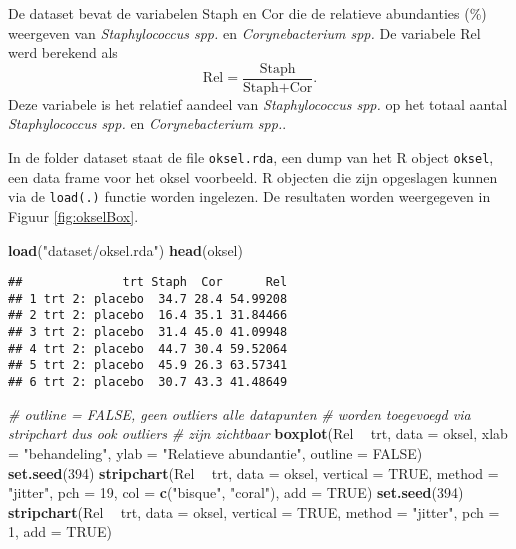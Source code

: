 \documentclass[12pt,dutch,coursenotes]{book}
\newenvironment{Shaded}{\begin{snugshade}}{\end{snugshade}}
\newcommand{\KeywordTok}[1]{\textcolor[rgb]{0.13,0.29,0.53}{\textbf{#1}}}
\newcommand{\DataTypeTok}[1]{\textcolor[rgb]{0.13,0.29,0.53}{#1}}
\newcommand{\DecValTok}[1]{\textcolor[rgb]{0.00,0.00,0.81}{#1}}
\newcommand{\StringTok}[1]{\textcolor[rgb]{0.31,0.60,0.02}{#1}}
\newcommand{\CommentTok}[1]{\textcolor[rgb]{0.56,0.35,0.01}{\textit{#1}}}
\newcommand{\OtherTok}[1]{\textcolor[rgb]{0.56,0.35,0.01}{#1}}
\newcommand{\OperatorTok}[1]{\textcolor[rgb]{0.81,0.36,0.00}{\textbf{#1}}}
\newcommand{\NormalTok}[1]{#1}
\theoremstyle{definition}
\theoremstyle{definition}
\theoremstyle{definition}
\theoremstyle{remark}
\begin{document}
De dataset bevat de variabelen Staph en Cor die de relatieve abundanties
(\%) weergeven van \emph{Staphylococcus spp.} en \emph{Corynebacterium
spp.} De variabele Rel werd berekend als \[
    \text{Rel}=\frac{\text{Staph}}{\text{Staph}+\text{Cor}}.
  \] Deze variabele is het relatief aandeel van \emph{Staphylococcus
spp.} op het totaal aantal \emph{Staphylococcus spp.} en
\emph{Corynebacterium spp.}.

In de folder dataset staat de file \texttt{oksel.rda}, een dump van het
R object \texttt{oksel}, een data frame voor het oksel voorbeeld. R
objecten die zijn opgeslagen kunnen via de \texttt{load(.)} functie
worden ingelezen. De resultaten worden weergegeven in Figuur
\ref{fig:okselBox}.

\begin{Shaded}
\begin{Highlighting}[]
\KeywordTok{load}\NormalTok{(}\StringTok{"dataset/oksel.rda"}\NormalTok{)}
\KeywordTok{head}\NormalTok{(oksel)}
\end{Highlighting}
\end{Shaded}

\begin{verbatim}
##              trt Staph  Cor      Rel
## 1 trt 2: placebo  34.7 28.4 54.99208
## 2 trt 2: placebo  16.4 35.1 31.84466
## 3 trt 2: placebo  31.4 45.0 41.09948
## 4 trt 2: placebo  44.7 30.4 59.52064
## 5 trt 2: placebo  45.9 26.3 63.57341
## 6 trt 2: placebo  30.7 43.3 41.48649
\end{verbatim}

\begin{Shaded}
\begin{Highlighting}[]
\CommentTok{# outline = FALSE, geen outliers alle datapunten}
\CommentTok{# worden toegevoegd via stripchart dus ook outliers}
\CommentTok{# zijn zichtbaar}
\KeywordTok{boxplot}\NormalTok{(Rel }\OperatorTok{~}\StringTok{ }\NormalTok{trt, }\DataTypeTok{data =}\NormalTok{ oksel, }\DataTypeTok{xlab =} \StringTok{"behandeling"}\NormalTok{, }
    \DataTypeTok{ylab =} \StringTok{"Relatieve abundantie"}\NormalTok{, }\DataTypeTok{outline =} \OtherTok{FALSE}\NormalTok{)}
\KeywordTok{set.seed}\NormalTok{(}\DecValTok{394}\NormalTok{)}
\KeywordTok{stripchart}\NormalTok{(Rel }\OperatorTok{~}\StringTok{ }\NormalTok{trt, }\DataTypeTok{data =}\NormalTok{ oksel, }\DataTypeTok{vertical =} \OtherTok{TRUE}\NormalTok{, }
    \DataTypeTok{method =} \StringTok{"jitter"}\NormalTok{, }\DataTypeTok{pch =} \DecValTok{19}\NormalTok{, }\DataTypeTok{col =} \KeywordTok{c}\NormalTok{(}\StringTok{"bisque"}\NormalTok{, }
        \StringTok{"coral"}\NormalTok{), }\DataTypeTok{add =} \OtherTok{TRUE}\NormalTok{)}
\KeywordTok{set.seed}\NormalTok{(}\DecValTok{394}\NormalTok{)}
\KeywordTok{stripchart}\NormalTok{(Rel }\OperatorTok{~}\StringTok{ }\NormalTok{trt, }\DataTypeTok{data =}\NormalTok{ oksel, }\DataTypeTok{vertical =} \OtherTok{TRUE}\NormalTok{, }
    \DataTypeTok{method =} \StringTok{"jitter"}\NormalTok{, }\DataTypeTok{pch =} \DecValTok{1}\NormalTok{, }\DataTypeTok{add =} \OtherTok{TRUE}\NormalTok{)}
\end{Highlighting}
\end{Shaded}
\end{document}
